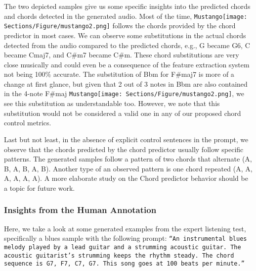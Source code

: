 \documentclass[11pt]{article}
\newcommand{\model}{\texttt{Mustango}}
\newcommand{\modelemoji}{\model{}\texttt{[image: Sections/Figure/mustango2.png]}}
\begin{document}
The two depicted samples give us some specific insights into the predicted chords and chords detected in the generated audio. Most of the time, \modelemoji{} follows the chords provided by the chord predictor in most cases. We can observe some substitutions in the actual chords detected from the audio compared to the predicted chords, e.g., G became G6, C became Cmaj7, and C\#m7 became C\#m. These chord substitutions are very close musically and could even be a consequence of the feature extraction system not being 100\% accurate. The substitution of Bbm for F\#maj7 is more of a change at first glance, but given that 2 out of 3 notes in Bbm are also contained in the 
4-note F\#maj \modelemoji{}, we see this substitution as understandable too. However, we note that this substitution would not be considered a valid one in any of our proposed chord control metrics.

Last but not least, in the absence of explicit control sentences in the prompt, we observe that the chords predicted by the chord predictor usually follow specific patterns. The generated samples follow a pattern of two chords that alternate (A, B, A, B, A, B). Another type of an observed pattern is one chord repeated (A, A, A, A, A, A). A more elaborate study on the Chord predictor behavior should be a topic for future work.






























\subsubsection{Insights from the Human Annotation}
Here, we take a look at some generated examples from the expert listening test, specifically a blues sample with the following prompt: \texttt{``An instrumental blues melody played by a lead guitar and a strumming acoustic guitar. The acoustic guitarist's strumming keeps the rhythm steady. The chord sequence is G7, F7, C7, G7. This song goes at 100 beats per minute.''}
\end{document}
